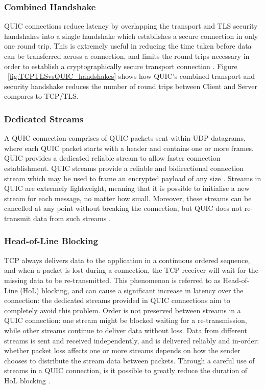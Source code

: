 \documentclass{l4proj}
\begin{document}
\subsubsection{Combined Handshake} QUIC connections reduce latency by overlapping the transport and TLS security handshakes into a single handshake which establishes a secure connection in only one round trip. This is extremely useful in reducing the time taken before data can be transferred across a connection, and limits the round trips necessary in order to establish a cryptographically secure transport connection \citep{Lang2017}. Figure ~\ref{fig:TCPTLSvsQUIC_handshakes} shows how QUIC's combined transport and security handshake reduces the number of round trips between Client and Server compares to TCP/TLS.

\subsubsection{Dedicated Streams} A QUIC connection comprises of QUIC packets sent within UDP datagrams, where each QUIC packet starts with a header and contains one or more frames. QUIC provides a dedicated reliable stream to allow faster connection establishment. QUIC streams provide a reliable and bidirectional connection stream which may be used to frame an encrypted payload of any size \citep{Iyen2021}. Streams in QUIC are extremely lightweight, meaning that it is possible to initialise a new stream for each message, no matter how small. Moreover, these streams can be cancelled at any point without breaking the connection, but QUIC does not re-transmit data from such streams \citep{Lang2017}. 

\subsubsection{Head-of-Line Blocking} TCP always delivers data to the application in a continuous ordered sequence, and when a packet is lost during a connection, the TCP receiver will wait for the missing data to be re-transmitted. This phenomenon is referred to as Head-of-Line (HoL) blocking, and can cause a significant increase in latency over the connection: the dedicated streams provided in QUIC connections aim to completely avoid this problem. Order is not preserved between streams in a QUIC connection: one stream might be blocked waiting for a re-transmission, while other streams continue to deliver data without loss. Data from different streams is sent and received independently, and is delivered reliably and in-order: whether packet loss affects one or more streams depends on how the sender chooses to distribute the stream data between packets. Through a careful use of streams in a QUIC connection, is it possible to greatly reduce the duration of HoL blocking \citep{Lang2017}.
\end{document}

